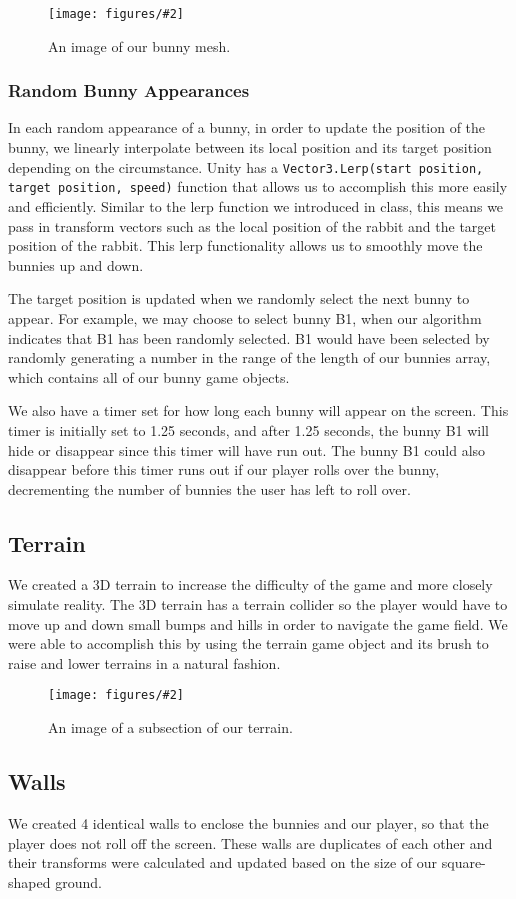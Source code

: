 \documentclass[12pt]{article}
\newcommand{\sfig}[3]{\begin{figure}[!ht]
\begin{center}
\texttt{[image: figures/\#2]}
\caption{#3}
\label{#2}
\end{center}
\end{figure}}
\begin{document}
  \sfig{2in}{bunny}{An image of our bunny mesh.}

\subsubsection{Random Bunny Appearances}
  In each random appearance of a bunny, in order to update the position of the bunny, we linearly interpolate between its local position and its target position depending on the circumstance. Unity has a \verb+Vector3.Lerp(start position, target position, speed)+ function that allows us to accomplish this more easily and efficiently. Similar to the lerp function we introduced in class, this means we pass in transform vectors such as the local position of the rabbit and the target position of the rabbit. This lerp functionality allows us to smoothly move the bunnies up and down. 

  The target position is updated when we randomly select the next bunny to appear. For example, we may choose to select bunny B1, when our algorithm indicates that B1 has been randomly selected. B1 would have been selected by randomly generating a number in the range of the length of our bunnies array, which contains all of our bunny game objects. 

  We also have a timer set for how long each bunny will appear on the screen. This timer is initially set to 1.25 seconds, and after 1.25 seconds, the bunny B1 will hide or disappear since this timer will have run out. The bunny B1 could also disappear before this timer runs out if our player rolls over the bunny, decrementing the number of bunnies the user has left to roll over.


\subsection{Terrain}
  We created a 3D terrain to increase the difficulty of the game and more closely simulate reality. The 3D terrain has a terrain collider so the player would have to move up and down small bumps and hills in order to navigate the game field. We were able to accomplish this by using the terrain game object and its brush to raise and lower terrains in a natural fashion.

  \sfig{4in}{terrain}{An image of a subsection of our terrain.}

\subsection{Walls}
  We created 4 identical walls to enclose the bunnies and our player, so that the player does not roll off the screen. These walls are duplicates of each other and their transforms were calculated and updated based on the size of our square-shaped ground.
\end{document}
